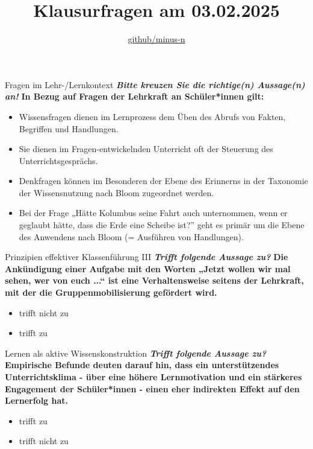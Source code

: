 \documentclass[a4paper]{article}
\title{Klausurfragen am 03.02.2025}
\author{\href{https://github.com/minus-n/BiWi-Klausurzusammenfassung}{github/minus-n}}
\newcommand{\ACorrectAnswer}{\rlap{$\square$}{\raisebox{2pt}{\large\hspace{1pt}\ding{51}}}\hspace{-2.5pt}}
\newcommand{\AWrongAnswer}{\rlap{$\square$}{\large\hspace{1pt}\ding{55}}}
\newcommand{\AnUnsureAnswer}{\rlap{$\square$}{\large\hspace{1pt}\textbf?}}
\newcommand{\TheCorrectAnswer}{\rlap{\hspace{1.4pt}$\bullet$}{$\ocircle$}}
\newcommand{\TheWrongAnswer}{$\ocircle$}
\newcommand{\defaultCorrect}{\ding{51}}
\newcommand{\defaultWrong}{\ding{55}}
\newcommand{\defaultUnsure}{\textbf{?}}
\newenvironment{answers}{\begin{itemize}}{\end{itemize}}
\newcommand{\correct}{\defaultCorrect}
\newcommand{\wrong}{\defaultWrong}
\newcommand{\unsure}{\defaultUnsure}
\newenvironment{question}[2]{%
    \section[#1 \normalfont(#2)]{#1\\\small\normalfont\hyperlink{tableofcontents}{zurück zum Inhaltsverzeichnis}}%
}{%
    \newpage%
}
\newcommand{\questiontext}[1]{\textbf{#1}}
\newcommand{\assignment}[1]{\textbf{\textit{#1}}\newline}
\newenvironment{multiple-choice}[1]{%
    \begin{question}{#1}{Multiple Choice}%
    \renewenvironment{answers}{%
        \begin{multiple-choice-list}}{\end{multiple-choice-list}%
    }%
    \renewcommand{\correct}{\ACorrectAnswer}%
    \renewcommand{\wrong}{\AWrongAnswer}%
    \renewcommand{\unsure}{\AnUnsureAnswer}%
}%
{%
    \renewcommand{\correct}{\defaultCorrect}%
    \renewcommand{\wrong}{\defaultWrong}%
    \renewcommand{\unsure}{\defaultUnsure}%
    \end{question}%
}
\newenvironment{single-choice}[1]{%
    \begin{question}{#1}{Single Choice}%
    \renewenvironment{answers}{%
        \begin{single-choice-list}}{\end{single-choice-list}%
    }%
    \renewcommand{\correct}{\TheCorrectAnswer}%
    \renewcommand{\wrong}{\TheWrongAnswer}%
    \renewcommand{\unsure}{TheUnsureAnswer}%
}{%
    \renewcommand{\correct}{\defaultCorrect}%
    \renewcommand{\wrong}{\defaultWrong}%
    \renewcommand{\unsure}{\defaultUnsure}%
    \end{question}%
}
\begin{document}

\maketitle
\newpage
\hypertarget{tableofcontents}{}
\tableofcontents
\newpage


\begin{multiple-choice}{Fragen im Lehr-/Lernkontext}
    \assignment{Bitte kreuzen Sie die richtige(n) Aussage(n) an!}
    \questiontext{In Bezug auf Fragen der Lehrkraft an Schüler*innen gilt:}
    \begin{answers}
        \item[\correct] Wissensfragen dienen im Lernprozess dem Üben des Abrufs von Fakten, Begriffen und Handlungen.
        \item[\correct] Sie dienen im Fragen-entwickelnden Unterricht oft der Steuerung des Unterrichtsgesprächs.
        \item[\wrong] Denkfragen können im Besonderen der Ebene des Erinnerns in der Taxonomie der Wissensnutzung nach Bloom zugeordnet werden.
        \item[\wrong] Bei der Frage „Hätte Kolumbus seine Fahrt auch unternommen, wenn er geglaubt hätte, dass die Erde eine Scheibe ist?” geht es primär um die Ebene des Anwendens nach Bloom (= Ausführen von Handlungen).
    \end{answers}
\end{multiple-choice}

\begin{single-choice}{Prinzipien effektiver Klassenführung III}
    \assignment{Trifft folgende Aussage zu?}
    \questiontext{Die Ankündigung einer Aufgabe mit den Worten „Jetzt wollen wir mal sehen, wer von euch ...“ ist eine Verhaltensweise seitens der Lehrkraft, mit der die Gruppenmobilisierung gefördert wird.}
    \begin{answers}
        \item[\correct] trifft nicht zu
        \item[\wrong] trifft zu
    \end{answers}
\end{single-choice}

\begin{single-choice}{Lernen als aktive Wissenskonstruktion}
    \assignment{Trifft folgende Aussage zu?}
    \questiontext{Empirische Befunde deuten darauf hin, dass ein unterstützendes Unterrichtsklima - über eine höhere Lernmotivation und ein stärkeres Engagement der Schüler*innen - einen eher indirekten Effekt auf den Lernerfolg hat.}
    \begin{answers}
        \item[\correct] trifft zu
        \item[\wrong] trifft nicht zu 
    \end{answers}
\end{single-choice}
\end{document}
